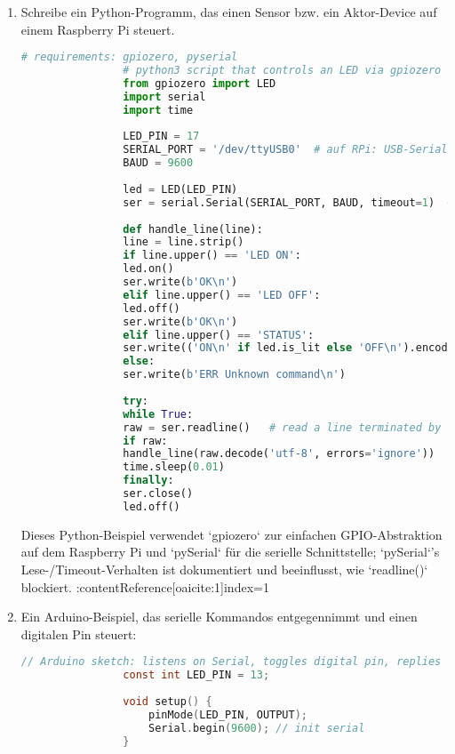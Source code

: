\documentclass[11pt,a4paper,oneside]{article}
\newcounter{boxseq}
\newcommand{\nextboxcolors}{%
	\stepcounter{boxseq}%
	\ifcase\value{boxseq}%
	\def\CurrentAccentName{Step0}%
	\or\def\CurrentAccentName{Step1}%
	\or\def\CurrentAccentName{Step2}%
	\or\def\CurrentAccentName{Step3}%
	\or\def\CurrentAccentName{Step4}%
	\or\def\CurrentAccentName{Step5}%
	\or\def\CurrentAccentName{Step6}%
	\else\def\CurrentAccentName{Step7}%
	\fi
	\edef\CurrentAccentDarkName{\CurrentAccentName!70!black}%
	\edef\CurrentAccentFrameName{\CurrentAccentName!50!black}%
}
\newcounter{aufgabe}[section]
\renewcommand{\theaufgabe}{\thesection.\arabic{aufgabe}}
\newenvironment{aufgabe}[1]{%
	\refstepcounter{aufgabe}%
	\nextboxcolors%
	\begin{tcolorbox}[termbase,
		colframe=\CurrentAccentFrameName,
		boxed title style={interior style={left color=\CurrentAccentName, right color=\CurrentAccentDarkName}},
		title={Aufgabe~\theaufgabe: #1}]%
	}{\end{tcolorbox}}
\begin{document}
	
	\begin{aufgabe}{Steuerung eines Mikroprozessors mit der seriellen Schnittstelle}
		\begin{enumerate}
			\item Schreibe ein Python-Programm, das einen Sensor bzw. ein Aktor-Device auf einem Raspberry Pi steuert.
			
			\begin{lstlisting}[language=Python, caption={Raspberry Pi: LED-Steuerung + serielle Steuerung (pySerial + gpiozero)}]
				# requirements: gpiozero, pyserial
				# python3 script that controls an LED via gpiozero and listens on a serial port for commands
				from gpiozero import LED
				import serial
				import time
				
				LED_PIN = 17
				SERIAL_PORT = '/dev/ttyUSB0'  # auf RPi: USB-Serial oder /dev/ttyAMA0 etc.
				BAUD = 9600
				
				led = LED(LED_PIN)
				ser = serial.Serial(SERIAL_PORT, BAUD, timeout=1)  # pySerial: blocking read behaviour depends on timeout
				
				def handle_line(line):
				line = line.strip()
				if line.upper() == 'LED ON':
				led.on()
				ser.write(b'OK\n')
				elif line.upper() == 'LED OFF':
				led.off()
				ser.write(b'OK\n')
				elif line.upper() == 'STATUS':
				ser.write(('ON\n' if led.is_lit else 'OFF\n').encode())
				else:
				ser.write(b'ERR Unknown command\n')
				
				try:
				while True:
				raw = ser.readline()   # read a line terminated by newline; depends on timeout. (pySerial)
				if raw:
				handle_line(raw.decode('utf-8', errors='ignore'))
				time.sleep(0.01)
				finally:
				ser.close()
				led.off()
			\end{lstlisting}
			
			Dieses Python-Beispiel verwendet `gpiozero` zur einfachen GPIO-Abstraktion auf dem Raspberry Pi und `pySerial` für die serielle Schnittstelle; `pySerial`'s Lese-/Timeout-Verhalten ist dokumentiert und beeinflusst, wie `readline()` blockiert. :contentReference[oaicite:1]{index=1}
			
			\item Ein Arduino-Beispiel, das serielle Kommandos entgegennimmt und einen digitalen Pin steuert:
			\begin{lstlisting}[language=C, caption={Arduino: Serial command handler}]
				// Arduino sketch: listens on Serial, toggles digital pin, replies with status
				const int LED_PIN = 13;
				
				void setup() {
					pinMode(LED_PIN, OUTPUT);
					Serial.begin(9600); // init serial
				}
				

\end{lstlisting}
\end{enumerate}
\end{aufgabe}
\end{document}
